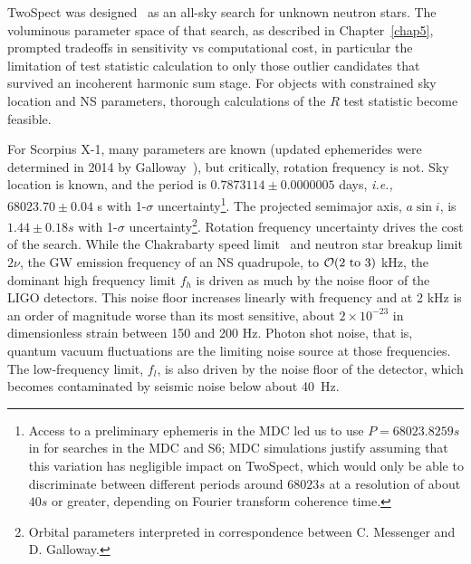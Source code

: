 TwoSpect was designed~\cite{GoetzThesis,GoetzTwoSpectMethods2011} as an all-sky search for unknown neutron stars.
The voluminous parameter space of that search, as described in Chapter~\ref{chap5}, prompted tradeoffs in sensitivity vs computational cost, in particular the limitation of test statistic calculation to only those outlier candidates that survived an incoherent harmonic sum stage. 
For objects with constrained sky location and NS parameters, thorough calculations of the $R$ test statistic become feasible.

For Scorpius X-1, many parameters are known (updated ephemerides were determined in 2014 by Galloway~\cite{Galloway2014}), but critically, rotation frequency is not.
Sky location is known, and the period is $0.7873114 \pm 0.0000005$ days, \textit{i.e.,} $68023.70 \pm 0.04$ s with 1-$\sigma$ uncertainty\footnote{Access to a preliminary ephemeris in the MDC led us to use $P = 68023.8259 s$ in for searches in the MDC and S6; MDC simulations justify assuming that this variation has negligible impact on TwoSpect, which would only be able to discriminate between different periods around $68023 s$ at a resolution of about $40 s$ or greater, depending on Fourier transform coherence time.}.
The projected semimajor axis, $a \sin i$, is $1.44 \pm 0.18 s$ with 1-$\sigma$ uncertainty\footnote{Orbital parameters interpreted in correspondence between C. Messenger and D. Galloway.}.
Rotation frequency uncertainty drives the cost of the search.
While the Chakrabarty speed limit~\cite{Chakrabarty2003} and neutron star breakup limit $2\nu$, the GW emission frequency of an NS quadrupole, to $\mathcal{O}(2\textup{ to }3)$ kHz, the dominant high frequency limit $f_h$ is driven as much by the noise floor of the LIGO detectors.
This noise floor increases linearly with frequency and at 2 kHz is an order of magnitude worse than its most sensitive, about $2\times10^{-23}$ in dimensionless strain between 150 and 200 Hz.
Photon shot noise, that is, quantum vacuum fluctuations are the limiting noise source at those frequencies.
The low-frequency limit, $f_l$, is also driven by the noise floor of the detector, which becomes contaminated by seismic noise below about 40~Hz.

